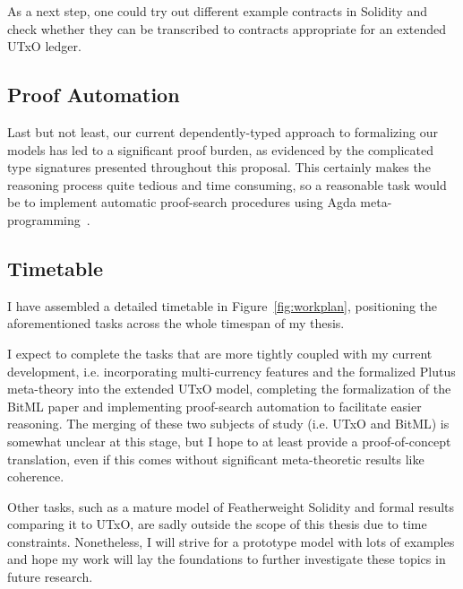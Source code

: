 \documentclass[acmsmall,nonacm=true,screen=true]{acmart}
\begin{document}
As a next step, one could try out different example contracts in Solidity and check whether they can be transcribed to
contracts appropriate for an extended UTxO ledger.

\subsection{Proof Automation}
Last but not least, our current dependently-typed approach to formalizing our models has led to a significant proof burden,
as evidenced by the complicated type signatures presented throughout this proposal.
This certainly makes the reasoning process quite tedious and time consuming, so a reasonable task would be
to implement automatic proof-search procedures using Agda meta-programming~\cite{agdaauto}.

\subsection{Timetable}
I have assembled a detailed timetable in Figure~\ref{fig:workplan},
positioning the aforementioned tasks across the whole timespan of my thesis.

I expect to complete the tasks that are more tightly coupled with my current development, i.e.
incorporating multi-currency features and the formalized Plutus meta-theory into the extended UTxO model,
completing the formalization of the BitML paper and implementing proof-search automation to facilitate easier reasoning.
The merging of these two subjects of study (i.e. UTxO and BitML) is somewhat unclear at this stage, but I hope
to at least provide a proof-of-concept translation, even if this comes without significant meta-theoretic results like coherence.

Other tasks, such as a mature model of Featherweight Solidity and formal results comparing it to UTxO,
are sadly outside the scope of this thesis due to time constraints.
Nonetheless, I will strive for a prototype model with lots of examples
and hope my work will lay the foundations to further investigate these topics in future research.

\newpage
\end{document}
